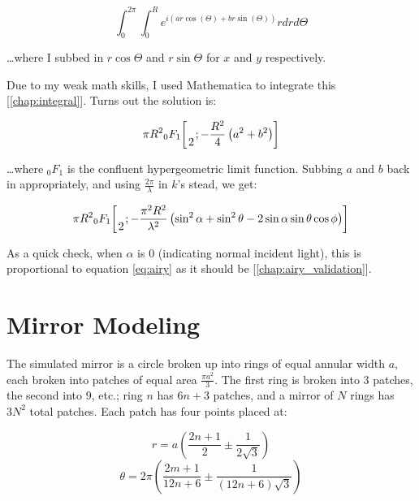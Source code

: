 \documentclass[etd,twoside,senior]{BYUPhys}
\newcommand*\pFqskip{8mu}
\newcommand*\pFq{\begingroup
        \catcode`\,\active
        \def ,{\mskip\pFqskip\relax}%
        \dopFq
}
\def\dopFq#1#2#3#4#5{%
        {}_{#1}F_{#2}\biggl[\genfrac..{0pt}{}{#3}{#4};#5\biggr]%
        \endgroup
}
\begin{document}
\begin{equation}\label{eq:integral1}
  \int_0^{2\pi}\int_0^R e^{i(ar\cos(\Theta)+br\sin(\Theta))} rdrd\Theta
\end{equation}

\ldots where I subbed in $r\cos\Theta$ and $r\sin\Theta$ for $x$ and $y$ respectively.

Due to my weak math skills, I used Mathematica to integrate this [\ref{chap:integral}]. Turns out the solution is:

\begin{equation}\label{eq:expected_refl}
  \pi R^2 \pFq{0}{1}{}{2}{-\frac{R^2}{4}\left(a^2+b^2\right)}
\end{equation}

\ldots where ${}_0 F_1$ is the confluent hypergeometric limit function. Subbing $a$ and $b$ back in appropriately, and using $\frac{2\pi}{\lambda}$ in $k$'s stead, we get:

\begin{equation}
  \pi R^2 \pFq{0}{1}{}{2}{-\frac{\pi^2 R^2}{\lambda^2}\left(\sin^2\alpha+\sin^2\theta-2\sin\alpha\sin\theta\cos\phi\right)}
\end{equation}

As a quick check, when $\alpha$ is 0 (indicating normal incident light), this is proportional to equation \ref{eq:airy} as it should be [\ref{chap:airy_validation}].







\section{Mirror Modeling} \label{section:mirror_modeling}

The simulated mirror is a circle broken up into rings of equal annular width $a$, each broken into patches of equal area $\frac{\pi a^2}{3}$. The first ring is broken into 3 patches, the second into 9, etc.; ring $n$ has $6n+3$ patches, and a mirror of $N$ rings has $3N^2$ total patches. Each patch has four points placed at:

\begin{equation}
  r = a \left(\frac{2n+1}{2} \pm \frac{1}{2\sqrt{3}}\right)
\end{equation}
\begin{equation}
  \theta = 2\pi \left(\frac{2m+1}{12n+6} \pm \frac{1}{\left(12n+6\right)\sqrt{3}}\right)
\end{equation}
\end{document}
